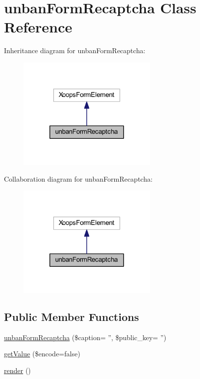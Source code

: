 \hypertarget{classunban_form_recaptcha}{\section{unban\-Form\-Recaptcha Class Reference}
\label{classunban_form_recaptcha}
}


Inheritance diagram for unban\-Form\-Recaptcha\-:
\nopagebreak
\begin{figure}[H]
\begin{center}
\leavevmode
\includegraphics[width=192pt]{classunban_form_recaptcha__inherit__graph}
\end{center}
\end{figure}


Collaboration diagram for unban\-Form\-Recaptcha\-:
\nopagebreak
\begin{figure}[H]
\begin{center}
\leavevmode
\includegraphics[width=192pt]{classunban_form_recaptcha__coll__graph}
\end{center}
\end{figure}
\subsection*{Public Member Functions}
\begin{DoxyCompactItemize}
\item 
\hyperlink{classunban_form_recaptcha_a6c93c661a20e78774949e65324da6ce3}{unban\-Form\-Recaptcha} (\$caption= '', \$public\-\_\-key= '')
\item 
\hyperlink{classunban_form_recaptcha_ab3c79e314dfd09da4de90fb2ce5eaa9d}{get\-Value} (\$encode=false)
\item 
\hyperlink{classunban_form_recaptcha_afde88292c44dc59faf017738dae6dffb}{render} ()
\end{DoxyCompactItemize}
